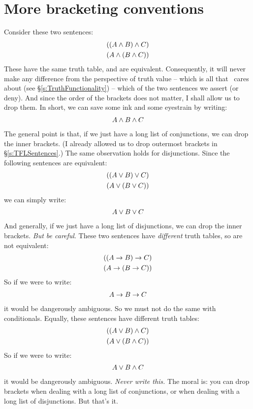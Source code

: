 \section{More bracketing conventions}\label{s:MoreBracketingConventions}
Consider these two sentences:
	\begin{align*}
		((A \wedge B) \wedge C)\\
		(A \wedge (B \wedge C))
	\end{align*}
These have the same truth table, and are equivalent. Consequently, it will never make any difference from the perspective of truth value – which is all that \TFL\ cares about (see §\ref{s:TruthFunctionality}) – which of the two sentences we assert (or deny). And since the order of the brackets does not matter, I shall allow us to drop them.  In short, we can save some ink and some eyestrain by writing:
	\begin{align*}
		A \wedge B \wedge C
	\end{align*}
The general point is that, if we just have a long list of conjunctions, we can drop the inner brackets. (I already allowed us to drop outermost brackets in §\ref{s:TFLSentences}.) The same observation holds for disjunctions. Since the following sentences are equivalent:
	\begin{align*}
		((A \vee B) \vee C)\\
		(A \vee (B \vee C))
	\end{align*}
we can simply write:
	\begin{align*}
		A \vee B \vee C
	\end{align*}
And generally, if we just have a long list of disjunctions, we can drop the inner brackets. \emph{But be careful}. These two sentences have \emph{different} truth tables, so are not equivalent:
	\begin{align*}
		((A \rightarrow B) \rightarrow C)\\
		(A \rightarrow (B \rightarrow C))
	\end{align*}
So if we were to write:
	\begin{align*}
		A \rightarrow B \rightarrow C
	\end{align*}
it would be dangerously ambiguous. So we must not do the same with conditionals. Equally, these sentences have different truth tables:
	\begin{align*}
		((A \vee B) \wedge C)\\
		(A \vee (B \wedge C))
	\end{align*}
So if we were to write:
	\begin{align*}
		A \vee B \wedge C
	\end{align*}
it would be dangerously ambiguous. \emph{Never write this.} The moral is: you can drop brackets when dealing with a long list of conjunctions, or when dealing with a long list of disjunctions. But that's it.


